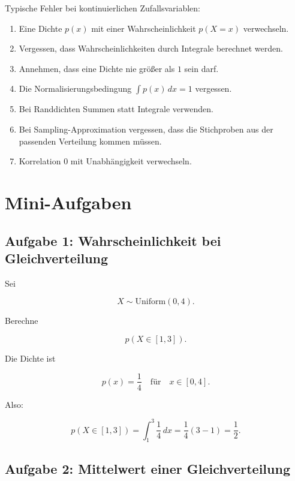 \begin{examtipbox}
Typische Fehler bei kontinuierlichen Zufallsvariablen:

\begin{enumerate}
    \item Eine Dichte \(p(x)\) mit einer Wahrscheinlichkeit \(p(X=x)\) verwechseln.
    \item Vergessen, dass Wahrscheinlichkeiten durch Integrale berechnet werden.
    \item Annehmen, dass eine Dichte nie größer als \(1\) sein darf.
    \item Die Normalisierungsbedingung \(\int p(x)\,dx=1\) vergessen.
    \item Bei Randdichten Summen statt Integrale verwenden.
    \item Bei Sampling-Approximation vergessen, dass die Stichproben aus der passenden Verteilung kommen müssen.
    \item Korrelation \(0\) mit Unabhängigkeit verwechseln.
\end{enumerate}
\end{examtipbox}

\section{Mini-Aufgaben}

\subsection{Aufgabe 1: Wahrscheinlichkeit bei Gleichverteilung}

Sei

\[
    X \sim \mathrm{Uniform}(0,4).
\]

Berechne

\[
    p(X \in [1,3]).
\]

\begin{examplebox}
Die Dichte ist

\[
    p(x)
    =
    \frac{1}{4}
    \quad
    \text{für}
    \quad
    x \in [0,4].
\]

Also:

\[
    p(X \in [1,3])
    =
    \int_1^3
    \frac{1}{4}\,dx
    =
    \frac{1}{4}
    (3-1)
    =
    \frac{1}{2}.
\]
\end{examplebox}

\subsection{Aufgabe 2: Mittelwert einer Gleichverteilung}

